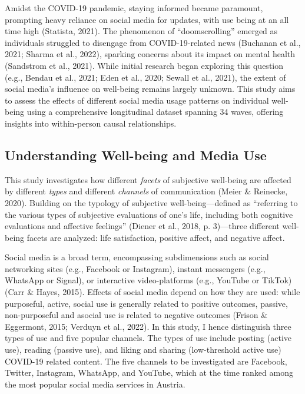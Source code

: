\documentclass[
  man,mask,floatsintext]{apa7}
\begin{document}
Amidst the COVID-19 pandemic, staying informed became paramount, prompting heavy reliance on social media for updates, with use being at an all time high (Statista, 2021).
The phenomenon of ``doomscrolling'' emerged as individuals struggled to disengage from COVID-19-related news (Buchanan et al., 2021; Sharma et al., 2022), sparking concerns about its impact on mental health (Sandstrom et al., 2021).
While initial research began exploring this question (e.g., Bendau et al., 2021; Eden et al., 2020; Sewall et al., 2021), the extent of social media's influence on well-being remains largely unknown.
This study aims to assess the effects of different social media usage patterns on individual well-being using a comprehensive longitudinal dataset spanning 34 waves, offering insights into within-person causal relationships.

\subsection{Understanding Well-being and Media Use}\label{understanding-well-being-and-media-use}

This study investigates how different \emph{facets} of subjective well-being are affected by different \emph{types} and different \emph{channels} of communication (Meier \& Reinecke, 2020).
Building on the typology of subjective well-being---defined as ``referring to the various types of subjective evaluations of one's life, including both cognitive evaluations and affective
feelings'' (Diener et al., 2018, p. 3)---three different well-being facets are analyzed: life satisfaction, positive affect, and negative affect.

Social media is a broad term, encompassing subdimensions such as social networking sites (e.g., Facebook or Instagram), instant messengers (e.g., WhatsApp or Signal), or interactive video-platforms (e.g., YouTube or TikTok) (Carr \& Hayes, 2015).
Effects of social media depend on how they are used: while purposeful, active, social use is generally related to positive outcomes, passive, non-purposeful and asocial use is related to negative outcomes (Frison \& Eggermont, 2015; Verduyn et al., 2022).
In this study, I hence distinguish three types of use and five popular channels.
The types of use include posting (active use), reading (passive use), and liking and sharing (low-threshold active use) COVID-19 related content.
The five channels to be investigated are Facebook, Twitter, Instagram, WhatsApp, and YouTube, which at the time ranked among the most popular social media services in Austria.
\end{document}
